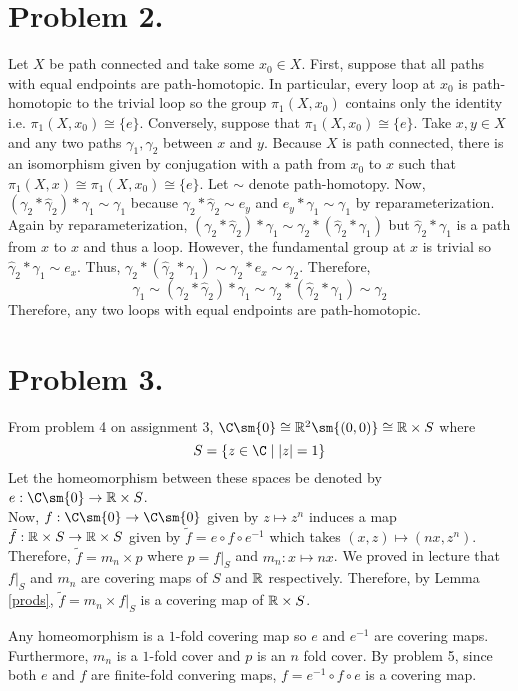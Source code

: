 \documentclass[12pt]{extarticle}
\begin{document}
\section*{Problem 2.}
Let $X$ be path connected and take some $x_0 \in X$. First, suppose that all paths with equal endpoints are path-homotopic. In particular, every loop at $x_0$ is path-homotopic to the trivial loop so the group $\pi_1(X, x_0)$ contains only the identity i.e. $\pi_1(X, x_0) \cong \{e\}$. Conversely, suppose that $\pi_1(X, x_0) \cong \{e\}$. Take $x, y \in X$ and any two paths $\gamma_1, \gamma_2$ between $x$ and $y$. Because $X$ is path connected, there is an isomorphism given by conjugation with a path from $x_0$ to $x$ such that $\pi_1(X, x) \cong \pi_1(X, x_0) \cong \{e\}$. Let $\sim$ denote path-homotopy. Now, $(\gamma_2 * \hat{\gamma}_2) * \gamma_1  \sim \gamma_1$ because $\gamma_2 * \hat{\gamma}_2 \sim e_y$ and $e_y * \gamma_1 \sim \gamma_1$ by reparameterization. Again by reparameterization, $(\gamma_2 * \hat{\gamma}_2) * \gamma_1  \sim \gamma_2 * (\hat{\gamma}_2 * \gamma_1)$ but $\hat{\gamma}_2 * \gamma_1$ is a path from $x$ to $x$ and thus a loop. However, the fundamental group at $x$ is trivial so $\hat{\gamma}_2 * \gamma_1 \sim e_x$. Thus, $\gamma_2 * (\hat{\gamma}_2 * \gamma_1) \sim \gamma_2 * e_x \sim \gamma_2$. Therefore, \[\gamma_1 \sim (\gamma_2 * \hat{\gamma}_2) * \gamma_1  \sim \gamma_2 * (\hat{\gamma}_2 * \gamma_1) \sim \gamma_2\]
Therefore, any two loops with equal endpoints are path-homotopic. 

\section*{Problem 3.}

From problem 4 on assignment 3, $\C \sm \{0\} \cong \R^2 \sm \{(0,0)\} \cong \R \times S$ where \[S = \{z \in \C \mid |z| = 1\}\]
Let the homeomorphism between these spaces be denoted by $e : \C \sm \{0\} \to \R \times S$. \bigskip \\
Now, $f : \C \sm \{0\} \to \C \sm \{0\}$ given by $z \mapsto z^n$ induces a map $\tilde{f} : \mathbb{R} \times S \to \mathbb{R} \times S$ given by $\tilde{f} = e \circ f \circ e^{-1}$ which takes $(x, z) \mapsto (nx, z^n)$. Therefore, $\tilde{f} = m_n \times p$ where $p = f|_S$ and $m_n : x \mapsto nx$. We proved in lecture that $f|_S$ and $m_n$ are covering maps of $S$ and $\mathbb{R}$ respectively. Therefore, by Lemma \ref{prods}, $\tilde{f} = m_n \times f|_S$ is a covering map of $\mathbb{R} \times S$. 

\begin{center}
\end{center}
Any homeomorphism is a $1$-fold covering map so $e$ and $e^{-1}$ are covering maps. Furthermore, $m_n$ is a $1$-fold cover and $p$ is an $n$ fold cover. By problem 5, since both $e$ and $f$ are finite-fold convering maps, $f = e^{-1} \circ f \circ e$ is a covering map.      
\end{document}
